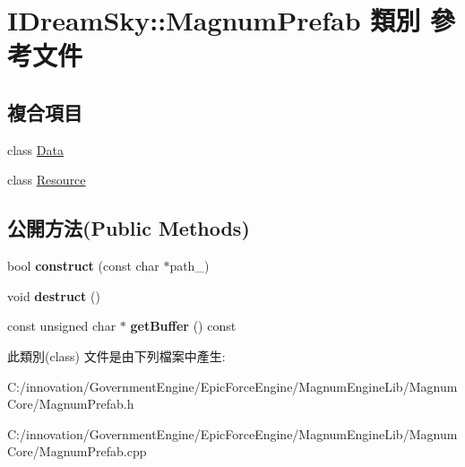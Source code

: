 \hypertarget{class_i_dream_sky_1_1_magnum_prefab}{}\section{I\+Dream\+Sky\+:\+:Magnum\+Prefab 類別 參考文件}
\label{class_i_dream_sky_1_1_magnum_prefab}
\subsection*{複合項目}
\begin{DoxyCompactItemize}
\item 
class \hyperlink{class_i_dream_sky_1_1_magnum_prefab_1_1_data}{Data}
\item 
class \hyperlink{class_i_dream_sky_1_1_magnum_prefab_1_1_resource}{Resource}
\end{DoxyCompactItemize}
\subsection*{公開方法(Public Methods)}
\begin{DoxyCompactItemize}
\item 
bool {\bfseries construct} (const char $\ast$path\+\_\+)\hypertarget{class_i_dream_sky_1_1_magnum_prefab_a263ad6cafa84552f40beffd12e077fad}{}\label{class_i_dream_sky_1_1_magnum_prefab_a263ad6cafa84552f40beffd12e077fad}

\item 
void {\bfseries destruct} ()\hypertarget{class_i_dream_sky_1_1_magnum_prefab_adbe3b9f45f9530f6c4696e255f8fda7c}{}\label{class_i_dream_sky_1_1_magnum_prefab_adbe3b9f45f9530f6c4696e255f8fda7c}

\item 
const unsigned char $\ast$ {\bfseries get\+Buffer} () const \hypertarget{class_i_dream_sky_1_1_magnum_prefab_aa1563fc0981a4b37c9c59adb81807184}{}\label{class_i_dream_sky_1_1_magnum_prefab_aa1563fc0981a4b37c9c59adb81807184}

\end{DoxyCompactItemize}


此類別(class) 文件是由下列檔案中產生\+:\begin{DoxyCompactItemize}
\item 
C\+:/innovation/\+Government\+Engine/\+Epic\+Force\+Engine/\+Magnum\+Engine\+Lib/\+Magnum\+Core/Magnum\+Prefab.\+h\item 
C\+:/innovation/\+Government\+Engine/\+Epic\+Force\+Engine/\+Magnum\+Engine\+Lib/\+Magnum\+Core/Magnum\+Prefab.\+cpp\end{DoxyCompactItemize}
